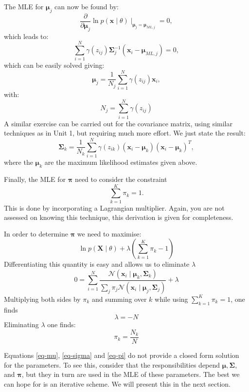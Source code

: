 The MLE for $\boldsymbol{\mu}_j$  can now be found by:
$$
 \frac{\partial}{\partial \boldsymbol{\mu}_j} \ln p(\boldsymbol{x} \mid \theta) \mid_{\boldsymbol{\mu}_j = \boldsymbol{\mu}_{ML,j}} = 0,
$$
   which leads to:
   $$
   \sum^N_{i=1} \gamma(z_{ij}) \boldsymbol{\Sigma}^{-1}_j (\boldsymbol{x}_i  - \boldsymbol{\mu}_{ML,j}) = 0,
   $$
   which can be easily solved giving:
   \begin{equation}
     \boldsymbol{\mu}_j = \frac{1}{N_j} \sum^N_{i=1} \gamma(z_{ij}) \boldsymbol{x}_i,
     \label{eq-mu}
   \end{equation}
   with:
   $$
   N_j = \sum^N_{i=1} \gamma(z_{ij})
   $$
   A similar exercise can be carried out for the covariance matrix, using similar techniques as in Unit 1,
   but requiring much more effort. We just state the result:
 \begin{equation}
     \boldsymbol{\Sigma}_k = \frac{1}{N_k} \sum^N_{i=1} \gamma( z_{ik} ) (\boldsymbol{x}_i - \boldsymbol{\mu}_k)(\boldsymbol{x}_i - \boldsymbol{\mu}_k)^T,
     \label{eq-sigma}
 \end{equation}
 where the $\boldsymbol{\mu}_k$ are the maximum likelihood estimates given above.

 Finally, the MLE for $\boldsymbol{\pi}$ need to consider the constraint
 $$
 \sum^K_{k=1} \pi_k = 1.
 $$
 This is done by incorporating a Lagrangian multiplier. Again,
 you are not assessed on knowing this technique, this derivation is given for completeness.

 In order to determine $\boldsymbol{\pi}$ we need to maximise:
 $$
 \ln p( \boldsymbol{X} \mid \theta) + \lambda( \sum^K_{k=1} \pi_k -1 )
 $$
 Differentiating this quantity is easy and allows us to eliminate $\lambda$
 $$
 0 = \sum^N_{i=1} \frac{ \mathcal{N}(\boldsymbol{x}_i \mid \boldsymbol{\mu}_k, \boldsymbol{\Sigma}_k)}{ \sum_j \pi_j \mathcal{N}(\boldsymbol{x}_i \mid \boldsymbol{\mu}_j, \boldsymbol{\Sigma}_j )} + \lambda
 $$
 Multiplying both sides by $\pi_k$ and summing over $k$ while using  $\sum^K_{k=1} \pi_k = 1$, one finds
 $$
 \lambda = -N
 $$
 Eliminating $\lambda$ one finds:
 \begin{equation}
   \pi_k = \frac{N_k}{N}
   \label{eq-pi}
 \end{equation}

 Equations \ref{eq-mu}, \ref{eq-sigma} and \ref{eq-pi} do not provide a closed form solution for the parameters. To see this, consider that the responsibilities depend
 $\boldsymbol{\mu}, \boldsymbol{\Sigma}$, and $\boldsymbol{\pi}$, but they in turn are used in the MLE of these parameters. The best we can hope for is an iterative scheme.
 We will present this in the next section.

